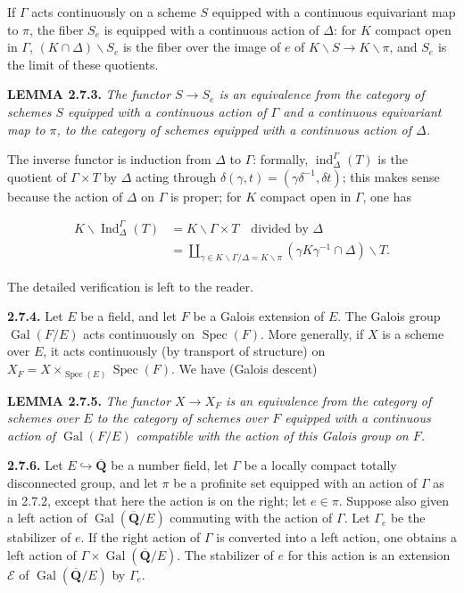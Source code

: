 \documentclass[10pt,a4paper]{article}
\newcommand{\SourcePage}[2]{\clearpage\setcounter{page}{#2}\typeout{D031_SOURCE_PAGE physical=#1 printed=#2}}
\begin{document}
If \(\Gamma\) acts continuously on a scheme \(S\) equipped with a continuous equivariant map to \(\pi\), the fiber \(S_e\) is equipped with a continuous action of \(\Delta\): for \(K\) compact open in \(\Gamma\), \((K\cap\Delta)\backslash S_e\) is the fiber over the image of \(e\) of \(K\backslash S\to K\backslash\pi\), and \(S_e\) is the limit of these quotients.

\textbf{LEMMA 2.7.3.} \emph{The functor \(S\to S_e\) is an equivalence from the category of schemes \(S\) equipped with a continuous action of \(\Gamma\) and a continuous equivariant map to \(\pi\), to the category of schemes equipped with a continuous action of \(\Delta\).}

The inverse functor is induction from \(\Delta\) to \(\Gamma\): formally, \(\operatorname{ind}_\Delta^\Gamma(T)\) is the quotient of \(\Gamma\times T\) by \(\Delta\) acting through \(\delta(\gamma,t)=(\gamma\delta^{-1},\delta t)\); this makes sense because the action of \(\Delta\) on \(\Gamma\) is proper; for \(K\) compact open in \(\Gamma\), one has

\SourcePage{40}{286}
\[
\begin{aligned}
K\backslash\operatorname{Ind}_\Delta^\Gamma(T)
&=K\backslash\Gamma\times T\quad\text{divided by }\Delta\\
&=\coprod_{\gamma\in K\backslash\Gamma/\Delta=K\backslash\pi}
(\gamma K\gamma^{-1}\cap\Delta)\backslash T.
\end{aligned}
\]

The detailed verification is left to the reader.

\textbf{2.7.4.} Let \(E\) be a field, and let \(F\) be a Galois extension of \(E\). The Galois group \(\operatorname{Gal}(F/E)\) acts continuously on \(\operatorname{Spec}(F)\). More generally, if \(X\) is a scheme over \(E\), it acts continuously (by transport of structure) on \(X_F=X\times_{\operatorname{Spec}(E)}\operatorname{Spec}(F)\). We have (Galois descent)

\textbf{LEMMA 2.7.5.} \emph{The functor \(X\to X_F\) is an equivalence from the category of schemes over \(E\) to the category of schemes over \(F\) equipped with a continuous action of \(\operatorname{Gal}(F/E)\) compatible with the action of this Galois group on \(F\).}

\textbf{2.7.6.} Let \(E\hookrightarrow\overline{\mathbf Q}\) be a number field, let \(\Gamma\) be a locally compact totally disconnected group, and let \(\pi\) be a profinite set equipped with an action of \(\Gamma\) as in 2.7.2, except that here the action is on the right; let \(e\in\pi\). Suppose also given a left action of \(\operatorname{Gal}(\overline{\mathbf Q}/E)\) commuting with the action of \(\Gamma\). Let \(\Gamma_e\) be the stabilizer of \(e\). If the right action of \(\Gamma\) is converted into a left action, one obtains a left action of \(\Gamma\times\operatorname{Gal}(\overline{\mathbf Q}/E)\). The stabilizer of \(e\) for this action is an extension \(\mathscr E\) of \(\operatorname{Gal}(\overline{\mathbf Q}/E)\) by \(\Gamma_e\).
\end{document}
